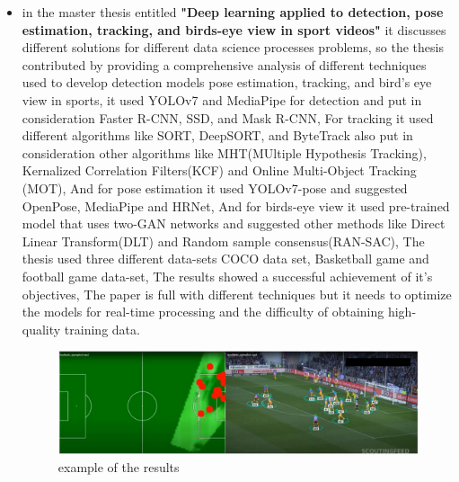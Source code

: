 \documentclass[12pt]{article}
\begin{document}
\begin{itemize}
        \item in the master thesis entitled \textbf{"Deep learning applied to detection, pose estimation, tracking, and birds-eye view in sport videos"}\cite{upm75832} it discusses different solutions for different data science processes problems, so the thesis contributed by providing a comprehensive analysis of different techniques used to develop detection models pose estimation, tracking, and bird's eye view in sports, it used YOLOv7 and MediaPipe for detection and put in consideration Faster R-CNN, SSD, and Mask R-CNN, For tracking it used different algorithms like SORT, DeepSORT, and ByteTrack also put in consideration other algorithms like MHT(MUltiple Hypothesis Tracking), Kernalized Correlation Filters(KCF) and Online Multi-Object Tracking (MOT), And for pose estimation it used YOLOv7-pose and suggested OpenPose, MediaPipe and HRNet, And for birds-eye view it used pre-trained model that uses two-GAN networks and suggested other methods like Direct Linear Transform(DLT) and Random sample consensus(RAN-SAC), The thesis used three different data-sets COCO data set, Basketball game and football game data-set, The results showed a successful achievement of it's objectives, The paper is full with different techniques but it needs to optimize the models for real-time processing and the difficulty of obtaining high-quality training data.
        \begin{figure}[H]
        \centering
        \includegraphics[width=1\linewidth]{figures/fig1.png}
        \caption{example of the results}
        \label{fig:example of the results. }
        \end{figure}


\end{itemize}
\end{document}
